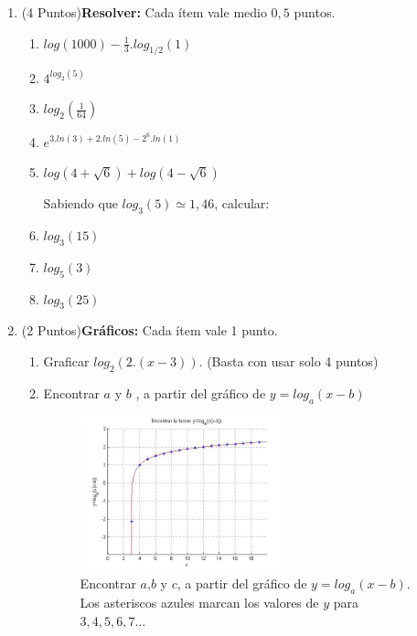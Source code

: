 \documentclass[a4paper, spanish]{exam}
\begin{document}
\begin{enumerate}
\item (4 Puntos)\textbf{Resolver:} Cada ítem vale medio $0,5$ puntos.
\begin{multicols}{2}
\begin{enumerate}
\item $log(1000)-\frac{1}{3}.log_{1/2}(1)$
\item $4^{log_2(5)}$
\item $log_2(\frac{1}{64})$
\item $e^{3.ln(3) + 2.ln(5) - 2^{6}.ln(1)}$

\columnbreak

\item $log(4+\sqrt{6})+log(4-\sqrt{6})$

Sabiendo que $log_3(5) \simeq 1,46$, calcular:

\item $log_3(15)$
\item $log_5(3)$
\item $log_3(25)$


\end{enumerate}
\end{multicols}

\item (2 Puntos)\textbf{Gráficos:}
Cada ítem vale 1 punto.
\begin{enumerate}
\item Graficar $log_2(2.(x-3))$. (Basta con usar solo 4 puntos)

\item Encontrar $a$ y $b$ ,  a partir del gráfico de $y=log_a(x-b)$

\begin{figure}[h!]
\centering
\includegraphics[width=0.6\textwidth]{logsencontrar1.jpg}
\caption{Encontrar $a$,$b$ y $c$,  a partir del gráfico de $y=log_a(x-b)$.
Los asteriscos azules marcan los valores de $y$ para $3,4,5,6,7...$}
\label{fig:logaritmo}
\end{figure}


\end{enumerate}
\end{enumerate}
\end{document}
